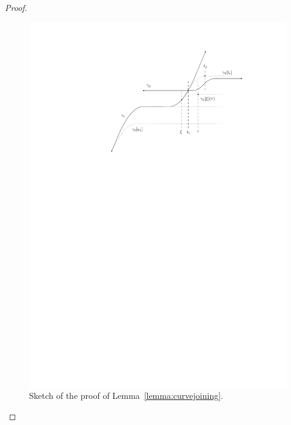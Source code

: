 \documentclass[a4paper]{article}
\theoremstyle{definition}
\theoremstyle{plain}
\begin{document}
\begin{proof}

\phantom{.}
\begin{outline}

  \begin{figure}
    \centering
    \includegraphics[scale=1]{figures/motion/rough/curvejoiningproof}
    \caption{Sketch of the proof of Lemma~\ref{lemma:curvejoining}.}%
    \label{fig:proof}
  \end{figure}




\end{outline}
\end{proof}
\end{document}
